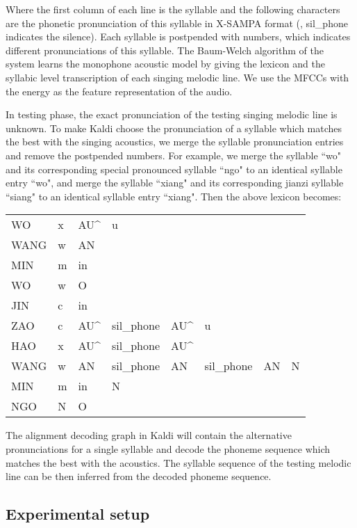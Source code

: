 Where the first column of each line is the syllable and the following characters are the phonetic pronunciation of this syllable in X-SAMPA format (, sil\_phone indicates the silence). Each syllable is postpended with numbers, which indicates different pronunciations of this syllable. The Baum-Welch algorithm of the system learns the monophone acoustic model by giving the lexicon and the syllabic level transcription of each singing melodic line. We use the MFCCs with the energy as the feature representation of the audio.

In testing phase, the exact pronunciation of the testing singing melodic line is unknown. To make Kaldi choose the pronunciation of a syllable which matches the best with the singing acoustics, we merge the syllable pronunciation entries and remove the postpended numbers. For example, we merge the syllable ``wo" and its corresponding special pronounced syllable ``ngo" to an identical syllable entry ``wo", and merge the syllable ``xiang" and its corresponding jianzi syllable ``siang" to an identical syllable entry ``xiang". Then the above lexicon becomes:

\begin{table}[ht!]
\begin{tabular}{llllllll}
WO & x & AU\^ & u & & & & \\
WANG & w & AN & & & & & \\
MIN & m & in & & & & & \\
WO & w & O & & & & & \\
JIN & c & in & & & & & \\
ZAO & c & AU\^ & sil\_phone & AU\^ & u & & \\
HAO & x & AU\^ & sil\_phone & AU\^ & & & \\
WANG & w & AN & sil\_phone & AN & sil\_phone & AN & N \\
MIN & m & in & N & & & & \\
NGO & N & O & & & & &
\end{tabular}
\end{table}

The alignment decoding graph in Kaldi will contain the alternative pronunciations for a single syllable and decode the phoneme sequence which matches the best with the acoustics. The syllable sequence of the testing melodic line can be then inferred from the decoded phoneme sequence.

\subsection{Experimental setup}\label{sec:ch6:experimental_setup_baseline}

